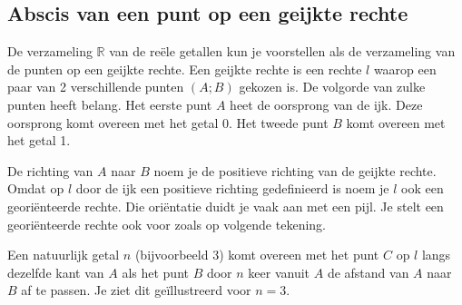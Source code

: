 \subsection{Abscis van een punt op een geijkte rechte}

De verzameling $\mathbb{R}$ van de re\"ele getallen kun je voorstellen als de verzameling van de punten op een geijkte rechte.
Een geijkte rechte is een rechte $l$ waarop een paar van 2 verschillende punten $(A;B)$ gekozen is.
De volgorde van zulke punten heeft belang.
Het eerste punt $A$ heet de oorsprong van de ijk.
Deze oorsprong komt overeen met het getal 0.
Het tweede punt $B$ komt overeen met het getal 1.


\begin{center}

\end{center}


De richting van $A$ naar $B$ noem je de positieve richting van de geijkte rechte.
Omdat op $l$ door de ijk een positieve richting gedefinieerd is noem je $l$ ook een geori\"enteerde rechte.
Die ori\"entatie duidt je vaak aan met een pijl.
Je stelt een geori\"enteerde rechte ook voor zoals op volgende tekening.

\begin{center}
	
\end{center}



Een natuurlijk getal $n$ (bijvoorbeeld 3) komt overeen met het punt $C$ op $l$ langs dezelfde kant van $A$ als het punt $B$ door $n$ keer vanuit $A$ de afstand van $A$ naar $B$ af te passen.
Je ziet dit ge\"illustreerd voor $n=3$.

